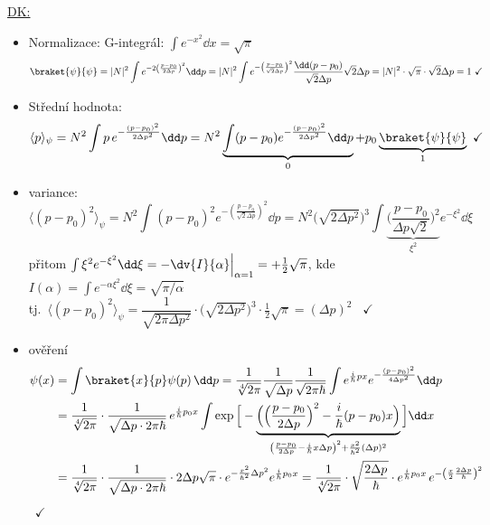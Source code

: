 \underline{DK:}
\begin{itemize}
  \item Normalizace: \quad G-integrál: $\int e^{-x^2}\dd x = \sqrt\pi$
  \[
    \braket{\psi}{\psi} = |N|^2\int e^{-2\left(\frac{p-p_0}{2\Delta p}\right)^2}\dd p
    = |N|^2\int e^{-\left(\frac{p-p_0}{\sqrt2\Delta p}\right)^2}\frac{\dd(p-p_0)}{\sqrt2\Delta p}\sqrt2\Delta p
    = |N|^2\cdot\sqrt\pi\cdot\sqrt2\Delta p = 1 \ \checkmark
  \]
  \item Střední hodnota:
  \[
    \langle p\rangle_\psi = N^2\int p\,e^{-\frac{(p-p_0)^2}{2\Delta p^2}}\dd p
    = N^2\underbrace{\int(p-p_0)e^{-\frac{(p-p_0)^2}{2\Delta p^2}}\dd p}_{0} + p_0\underbrace{\braket{\psi}{\psi}}_{1} \ \checkmark
  \]
  \item variance:
  \[
    \langle(p-p_0)^2\rangle_\psi = N^2\int(p-p_0)^2e^{-\left(\frac{p-p_0}{\sqrt2\Delta p}\right)^2}\dd p
    = N^2\big(\sqrt{2\Delta p^2}\big)^3\int\underbrace{\Big(\frac{p-p_0}{\Delta p\sqrt2}\Big)^2}_{\xi^2}e^{-\xi^2}\dd\xi
  \]
  přitom \quad $\int\xi^2e^{-\xi^2}\dd\xi = -\dv{I}{\alpha}\Big|_{\alpha=1} = +\frac12\sqrt\pi$, \quad
  kde $I(\alpha) = \int e^{-\alpha\xi^2}\dd\xi = \sqrt{\pi/\alpha}$ \\
  tj.\ \quad $\langle(p-p_0)^2\rangle_\psi = \dfrac{1}{\sqrt{2\pi\Delta p^2}}\cdot\big(\sqrt{2\Delta p^2}\big)^3\cdot\frac12\sqrt\pi = (\Delta p)^2$ \ $\checkmark$
  \item ověření
  \begin{align*}
    \psi(x) &= \int\braket{x}{p}\psi(p)\,\dd p
      = \frac{1}{\sqrt[4]{2\pi}}\frac{1}{\sqrt{\Delta p}}\frac{1}{\sqrt{2\pi\hbar}}\int e^{\frac{i}{\hbar}px}e^{-\frac{(p-p_0)^2}{4\Delta p^2}}\dd p \\
    &= \frac{1}{\sqrt[4]{2\pi}}\cdot\frac{1}{\sqrt{\Delta p\cdot 2\pi\hbar}}\,e^{\frac{i}{\hbar}p_0x}
       \int\exp\Big[-\underbrace{\Big(\Big(\frac{p-p_0}{2\Delta p}\Big)^2 - \frac{i}{\hbar}(p-p_0)x\Big)}_{\left(\frac{p-p_0}{2\Delta p} - \frac{i}{\hbar}x\Delta p\right)^2 + \frac{x^2}{\hbar^2}(\Delta p)^2}\Big]\dd x \\
    &= \frac{1}{\sqrt[4]{2\pi}}\cdot\frac{1}{\sqrt{\Delta p\cdot2\pi\hbar}}\cdot 2\Delta p\sqrt\pi\cdot
       e^{-\frac{x^2}{\hbar^2}\Delta p^2}e^{\frac{i}{\hbar}p_0x}
     = \frac{1}{\sqrt[4]{2\pi}}\cdot\sqrt{\frac{2\Delta p}{\hbar}}\cdot e^{\frac{i}{\hbar}p_0x}\,
       e^{-\left(\frac{x}{2}\frac{2\Delta p}{\hbar}\right)^2}
  \end{align*}
   \ $\checkmark$
\end{itemize}

